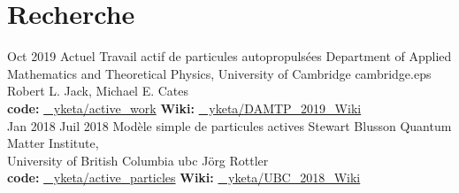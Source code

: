 \documentclass[letterpaper]{cvtemplate_fr} %
\begin{document}
\makeprofile %


\section{Recherche}

\begin{cvbody}

\cvitem
	{Oct 2019}
	{Actuel}
  {Travail actif de particules autopropuls\'ees}
  {Department of Applied Mathematics and Theoretical Physics, University of Cambridge }
  {cambridge.eps}
  {Robert L. Jack, Michael E. Cates}
  {\\
  {\bf code:} \href{https://github.com/yketa/active_work}{\faGithub~ yketa/active\_work} \hfill {\bf Wiki:} \href{https://yketa.github.io/DAMTP_2019_Wiki}{\faGithub~ yketa/DAMTP\_2019\_Wiki}
  }
  \\

\cvitem
	{Jan 2018}
	{Juil 2018}
	{Mod\`ele simple de particules actives}
  {Stewart Blusson Quantum Matter Institute,\\ University of British Columbia }
  {ubc}
  {J\"org Rottler}
  {\\
  {\bf code:} \href{https://github.com/yketa/active_particles}{\faGithub~ yketa/active\_particles} \hfill {\bf Wiki:} \href{https://yketa.github.io/UBC_2018_Wiki}{\faGithub~ yketa/UBC\_2018\_Wiki}
  }
  \\


\end{cvbody}
\end{document}
